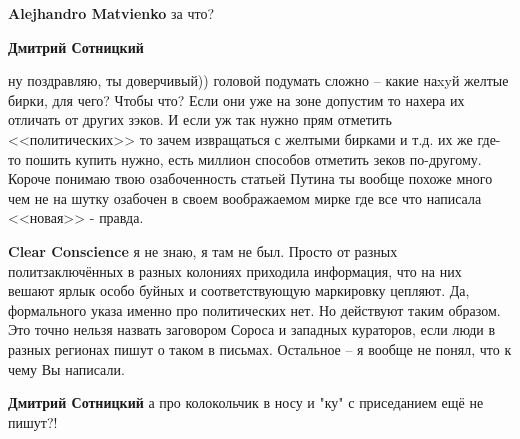 \begin{itemize}
\begin{itemize}
 
\textbf{Alejhandro Matvienko} за что?

 
\textbf{Дмитрий Сотницкий} 

ну поздравляю, ты доверчивый)) головой подумать сложно – какие наxyй желтые
бирки, для чего? Чтобы что? Если они уже на зоне допустим то нахера их отличать
от других зэков. И если уж так нужно прям отметить <<политических>> то зачем
извращаться с желтыми бирками и т.д. их же где-то пошить купить нужно, есть
миллион способов отметить зеков по-другому. Короче понимаю твою озабоченность
статьей Путина ты вообще похоже много чем не на шутку озабочен в своем
воображаемом мирке где все что написала <<новая>> - правда.

 
\textbf{Clear Conscience} я не знаю, я там не был. Просто от разных политзаключённых в разных колониях приходила информация, что на них вешают ярлык особо буйных и соответствующую маркировку цепляют. Да, формального указа именно про политических нет. Но действуют таким образом. Это точно нельзя назвать заговором Сороса и западных кураторов, если люди в разных регионах пишут о таком в письмах. Остальное – я вообще не понял, что к чему Вы написали.

 
\textbf{Дмитрий Сотницкий} а про колокольчик в носу и "ку" с приседанием ещё не пишут?!

 

\end{itemize}
\end{itemize}
